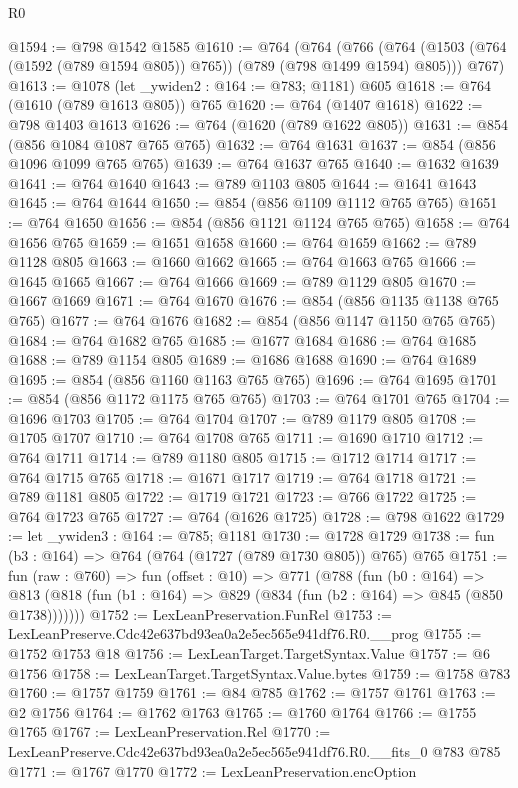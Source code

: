\begin{lexlean}{R0}
\begin{coremodule}
@1594 := @798 @1542 @1585
@1610 := @764
    (@764
      (@766 (@764 (@1503 (@764 (@1592 (@789 @1594 @805)) @765)) (@789 (@798 @1499 @1594) @805)))
      @767)
@1613 := @1078 (let _ywiden2 : @164 := @783; @1181) @605
@1618 := @764 (@1610 (@789 @1613 @805)) @765
@1620 := @764 (@1407 @1618)
@1622 := @798 @1403 @1613
@1626 := @764 (@1620 (@789 @1622 @805))
@1631 := @854 (@856 @1084 @1087 @765 @765)
@1632 := @764 @1631
@1637 := @854 (@856 @1096 @1099 @765 @765)
@1639 := @764 @1637 @765
@1640 := @1632 @1639
@1641 := @764 @1640
@1643 := @789 @1103 @805
@1644 := @1641 @1643
@1645 := @764 @1644
@1650 := @854 (@856 @1109 @1112 @765 @765)
@1651 := @764 @1650
@1656 := @854 (@856 @1121 @1124 @765 @765)
@1658 := @764 @1656 @765
@1659 := @1651 @1658
@1660 := @764 @1659
@1662 := @789 @1128 @805
@1663 := @1660 @1662
@1665 := @764 @1663 @765
@1666 := @1645 @1665
@1667 := @764 @1666
@1669 := @789 @1129 @805
@1670 := @1667 @1669
@1671 := @764 @1670
@1676 := @854 (@856 @1135 @1138 @765 @765)
@1677 := @764 @1676
@1682 := @854 (@856 @1147 @1150 @765 @765)
@1684 := @764 @1682 @765
@1685 := @1677 @1684
@1686 := @764 @1685
@1688 := @789 @1154 @805
@1689 := @1686 @1688
@1690 := @764 @1689
@1695 := @854 (@856 @1160 @1163 @765 @765)
@1696 := @764 @1695
@1701 := @854 (@856 @1172 @1175 @765 @765)
@1703 := @764 @1701 @765
@1704 := @1696 @1703
@1705 := @764 @1704
@1707 := @789 @1179 @805
@1708 := @1705 @1707
@1710 := @764 @1708 @765
@1711 := @1690 @1710
@1712 := @764 @1711
@1714 := @789 @1180 @805
@1715 := @1712 @1714
@1717 := @764 @1715 @765
@1718 := @1671 @1717
@1719 := @764 @1718
@1721 := @789 @1181 @805
@1722 := @1719 @1721
@1723 := @766 @1722
@1725 := @764 @1723 @765
@1727 := @764 (@1626 @1725)
@1728 := @798 @1622
@1729 := let _ywiden3 : @164 := @785; @1181
@1730 := @1728 @1729
@1738 := fun (b3 : @164) => @764 (@764 (@1727 (@789 @1730 @805)) @765) @765
@1751 := fun (raw : @760) =>
  fun (offset : @10) =>
  @771
    (@788
      (fun (b0 : @164) =>
      @813 (@818 (fun (b1 : @164) => @829 (@834 (fun (b2 : @164) => @845 (@850 @1738)))))))
@1752 := LexLeanPreservation.FunRel
@1753 := LexLeanPreserve.Cdc42e637bd93ea0a2e5ec565e941df76.R0.__prog
@1755 := @1752 @1753 @18
@1756 := LexLeanTarget.TargetSyntax.Value
@1757 := @6 @1756
@1758 := LexLeanTarget.TargetSyntax.Value.bytes
@1759 := @1758 @783
@1760 := @1757 @1759
@1761 := @84 @785
@1762 := @1757 @1761
@1763 := @2 @1756
@1764 := @1762 @1763
@1765 := @1760 @1764
@1766 := @1755 @1765
@1767 := LexLeanPreservation.Rel
@1770 := LexLeanPreserve.Cdc42e637bd93ea0a2e5ec565e941df76.R0.__fits_0 @783 @785
@1771 := @1767 @1770
@1772 := LexLeanPreservation.encOption

\end{coremodule}
\end{lexlean}

